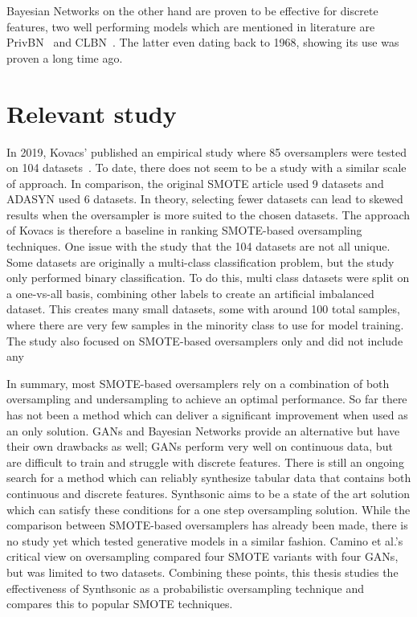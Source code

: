 Bayesian Networks on the other hand are proven to be effective for discrete features, two well performing models which are mentioned in literature are PrivBN~\cite{Zhang2014PrivBayes} and CLBN~\cite{Chow1968ApproximatingTrees}. The latter even dating back to 1968, showing its use was proven a long time ago. 

\section{Relevant study}
In 2019, Kovacs' published an empirical study where 85 oversamplers were tested on 104 datasets~\cite{Kovacs2019AnDatasets}. To date, there does not seem to be a study with a similar scale of approach. In comparison, the original SMOTE article used 9 datasets and ADASYN used 6 datasets. In theory, selecting fewer datasets can lead to skewed results when the oversampler is more suited to the chosen datasets. The approach of Kovacs is therefore a baseline in ranking SMOTE-based oversampling techniques. One issue with the study that the 104 datasets are not all unique. Some datasets are originally a multi-class classification problem, but the study only performed binary classification. To do this, multi class datasets were split on a one-vs-all basis, combining other labels to create an artificial imbalanced dataset. This creates many small datasets, some with around 100 total samples, where there are very few samples in the minority class to use for model training. The study also focused on SMOTE-based oversamplers only and did not include any 

In summary, most SMOTE-based oversamplers rely on a combination of both oversampling and undersampling to achieve an optimal performance. So far there has not been a method which can deliver a significant improvement when used as an only solution. GANs and Bayesian Networks provide an alternative but have their own drawbacks as well; GANs perform very well on continuous data, but are difficult to train and struggle with discrete features. There is still an ongoing search for a method which can reliably synthesize tabular data that contains both continuous and discrete features. Synthsonic aims to be a state of the art solution which can satisfy these conditions for a one step oversampling solution. While the comparison between SMOTE-based oversamplers has already been made, there is no study yet which tested generative models in a similar fashion. Camino et al.'s critical view on oversampling compared four SMOTE variants with four GANs, but was limited to two datasets. Combining these points, this thesis studies the effectiveness of Synthsonic as a probabilistic oversampling technique and compares this to popular SMOTE techniques.